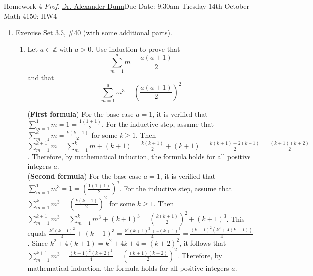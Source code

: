 




\newpage{}
{Homework 4}
{\textit{Prof.} \href{https://alexjdunn.weebly.com/}{Dr. Alexander Dunn}}{Due Date: 9:30am Tuesday 14th October}
{Math 4150: HW4}


\newpage





\begin{enumerate}
  \item Exercise Set 3.3, \#40 (with some additional parts).
  \begin{enumerate}
    \item Let $a \in \mathbb{Z}$ with $a>0$. Use induction to prove that
    $$
    \sum_{m=1}^a m=\frac{a(a+1)}{2}
    $$
    and that
    $$
    \sum_{m=1}^a m^3=\left(\frac{a(a+1)}{2}\right)^2
    $$
    \begin{subprove}
      (\textbf{First formula}) For the base case $a=1$, it is verified that $\sum_{m=1}^1 m = 1 = \frac{1(1+1)}{2}$.
      For the inductive step, assume that $\sum_{m=1}^k m = \frac{k(k+1)}{2}$ for some $k \geq 1$.
      Then $\sum_{m=1}^{k+1} m = \sum_{m=1}^k m + (k+1) = \frac{k(k+1)}{2} + (k+1) = \frac{k(k+1) + 2(k+1)}{2} = \frac{(k+1)(k+2)}{2}$.
      Therefore, by mathematical induction, the formula holds for all positive integers $a$.\vspace*{10px}\\
      
      (\textbf{Second formula}) For the base case $a=1$, it is verified that $\sum_{m=1}^1 m^3 = 1 = \left(\frac{1(1+1)}{2}\right)^2$.
      For the inductive step, assume that $\sum_{m=1}^k m^3 = \left(\frac{k(k+1)}{2}\right)^2$ for some $k \geq 1$.
      Then $\sum_{m=1}^{k+1} m^3 = \sum_{m=1}^k m^3 + (k+1)^3 = \left(\frac{k(k+1)}{2}\right)^2 + (k+1)^3$.
      This equals $\frac{k^2(k+1)^2}{4} + (k+1)^3 = \frac{k^2(k+1)^2 + 4(k+1)^3}{4} = \frac{(k+1)^2(k^2 + 4(k+1))}{4}$.
      Since $k^2 + 4(k+1) = k^2 + 4k + 4 = (k+2)^2$, it follows that $\sum_{m=1}^{k+1} m^3 = \frac{(k+1)^2(k+2)^2}{4} = \left(\frac{(k+1)(k+2)}{2}\right)^2$.
      Therefore, by mathematical induction, the formula holds for all positive integers $a$.
    \end{subprove}


\end{enumerate}
\end{enumerate}
